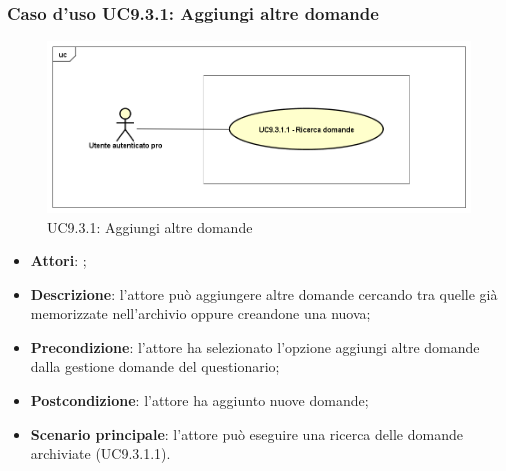 		 \subsubsection{Caso d'uso UC9.3.1: Aggiungi altre domande}
		 \label{UC9.3.1}
		 \begin{figure}[h]
		 	\centering
		 	\includegraphics[scale=0.5,keepaspectratio]{UML/UC9_3_1.png}
		 	\caption{UC9.3.1: Aggiungi altre domande}
		 \end{figure}
		 \FloatBarrier
		 \begin{itemize}
		 	\item \textbf{Attori}: \uaupro{};
		 	\item \textbf{Descrizione}: l'attore può aggiungere altre domande cercando tra quelle già memorizzate nell'archivio oppure creandone una nuova; 
		 	\item \textbf{Precondizione}: l'attore ha selezionato l'opzione aggiungi altre domande dalla gestione domande del questionario;
		 	\item \textbf{Postcondizione}: l'attore ha aggiunto nuove domande;
		 	\item \textbf{Scenario principale}: l'attore può eseguire una ricerca delle domande archiviate (UC9.3.1.1).
		 \end{itemize}
		 
